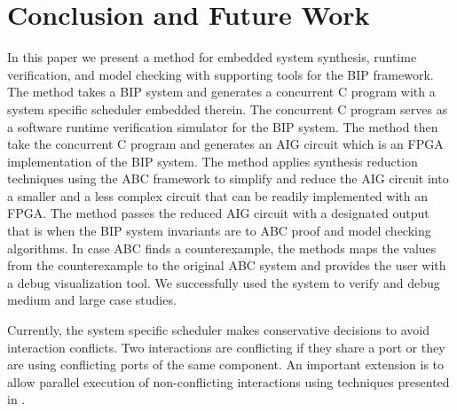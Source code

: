 \section{Conclusion and Future Work}
\label{sec:conclusion}

In this paper we present a method for embedded system synthesis, runtime verification,
and model checking with supporting tools for the BIP framework. 
The method takes a BIP system and generates a concurrent C program with a system 
specific scheduler embedded therein. 
The concurrent C program serves as a software runtime verification simulator for the 
BIP system.
The method then take the concurrent C program and generates an AIG circuit which is an
FPGA implementation of the BIP system. 
The method applies synthesis reduction techniques using the ABC framework 
to simplify and reduce the AIG circuit
into a smaller and a less complex circuit that can be readily implemented with an 
FPGA. 
The method passes the reduced AIG circuit with a designated output that is \true
when the BIP system invariants are \true to ABC proof and model checking 
algorithms. In case ABC finds a counterexample, the methods maps the values from 
the counterexample to the original ABC system and provides the user with a debug
visualization tool. 
We successfully used the system to verify and debug medium and large case studies. 


Currently, the system specific scheduler makes conservative decisions to avoid interaction conflicts. Two interactions are conflicting if they share a port or they are using conflicting ports of the same component. An important extension is to allow parallel execution of non-conflicting interactions using techniques presented in \cite{BonakdarpourBJQS12}. 

